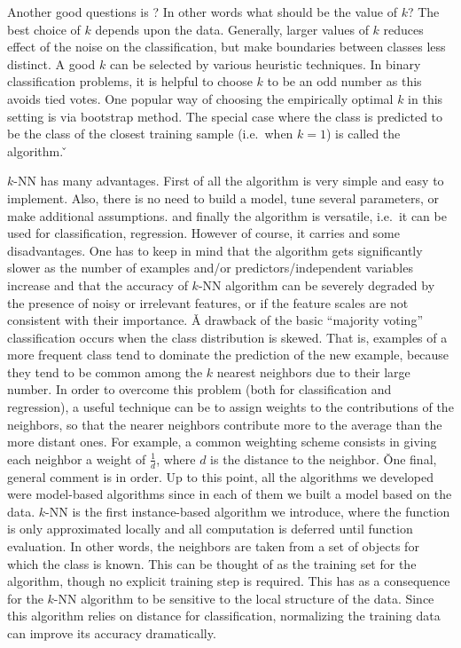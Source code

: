 Another good questions is ? In other words what should be the
value of $k$? The best choice of $k$ depends upon the data. Generally, larger values of $k$ reduces effect of the
noise on the classification, but make boundaries between classes less distinct. A good $k$ can be selected by various
heuristic techniques. In binary classification problems, it is helpful to choose $k$ to be an odd number as this
avoids tied votes. One popular way of choosing the empirically optimal $k$ in this setting is via bootstrap method.
The special case where the class is predicted to be the class of the closest training sample (i.e.\ when $k = 1$) is
called the  algorithm. \v


$k$-NN has many advantages. First of all the algorithm is very simple and easy to implement. Also, there is no need
to build a model, tune several parameters, or make additional assumptions. and finally the algorithm is versatile, i.e.\ 
it can be used for classification, regression. However of course, it carries and some disadvantages. One has to
keep in mind that the algorithm gets significantly slower as the number of examples and/or predictors/independent
variables increase and that the accuracy of $k$-NN algorithm can be severely degraded by the presence of noisy or
irrelevant features, or if the feature scales are not consistent with their importance. \v

A drawback of the basic ``majority voting'' classification occurs when the class distribution is skewed. That is,
examples of a more frequent class tend to dominate the prediction of the new example, because they tend to be common
among the $k$ nearest neighbors due to their large number. In order to overcome this problem (both for classification
and regression), a useful technique can be to assign weights to the contributions of the neighbors, so that the
nearer neighbors contribute more to the average than the more distant ones. For example, a common weighting scheme
consists in giving each neighbor a weight of $\frac{1}{d}$, where $d$ is the distance to the neighbor. \v

One final, general comment is in order. Up to this point, all the algorithms we developed were model-based algorithms
since in each of them we built a model based on the data. $k$-NN is the first instance-based algorithm we introduce,
where the function is only approximated locally and all computation is deferred until function evaluation. In other
words, the neighbors are taken from a set of objects for which the class is known. This can be thought of as the
training set for the algorithm, though no explicit training step is required. This has as a consequence for the
$k$-NN algorithm to be sensitive to the local structure of the data. Since this algorithm relies on distance for
classification, normalizing the training data can improve its accuracy dramatically.

